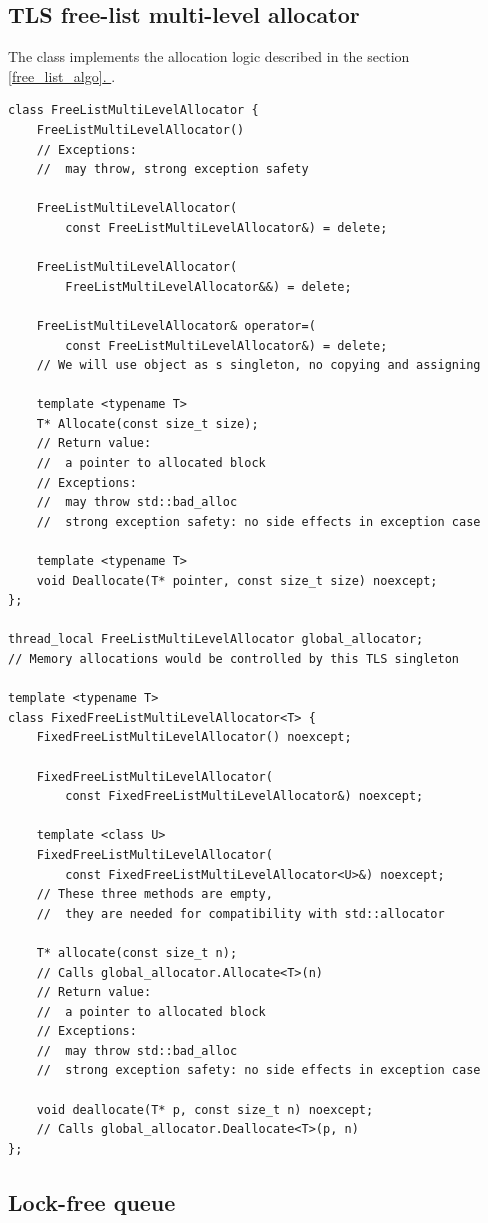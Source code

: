 \documentclass{article}
\newcommand*{\fullref}[1]{\hyperref[{#1}]{\ref*{#1}. \nameref*{#1}}}
\begin{document}
\subsection{TLS free-list multi-level allocator}

The class implements the allocation logic described in the section \fullref{free_list_algo}.

\begin{lstlisting}
class FreeListMultiLevelAllocator {
	FreeListMultiLevelAllocator()
	// Exceptions:
	// 	may throw, strong exception safety

	FreeListMultiLevelAllocator(
		const FreeListMultiLevelAllocator&) = delete;

	FreeListMultiLevelAllocator(
		FreeListMultiLevelAllocator&&) = delete;

	FreeListMultiLevelAllocator& operator=(
		const FreeListMultiLevelAllocator&) = delete;
	// We will use object as s singleton, no copying and assigning

	template <typename T>
	T* Allocate(const size_t size);
	// Return value:
	// 	a pointer to allocated block
	// Exceptions:
	// 	may throw std::bad_alloc
	// 	strong exception safety: no side effects in exception case

	template <typename T>
	void Deallocate(T* pointer, const size_t size) noexcept;
};

thread_local FreeListMultiLevelAllocator global_allocator;
// Memory allocations would be controlled by this TLS singleton

template <typename T>
class FixedFreeListMultiLevelAllocator<T> {
	FixedFreeListMultiLevelAllocator() noexcept;

	FixedFreeListMultiLevelAllocator(
		const FixedFreeListMultiLevelAllocator&) noexcept;

	template <class U>
	FixedFreeListMultiLevelAllocator(
		const FixedFreeListMultiLevelAllocator<U>&) noexcept;
	// These three methods are empty,
	// 	they are needed for compatibility with std::allocator

	T* allocate(const size_t n);
	// Calls global_allocator.Allocate<T>(n)
	// Return value:
	// 	a pointer to allocated block
	// Exceptions:
	// 	may throw std::bad_alloc
	// 	strong exception safety: no side effects in exception case

	void deallocate(T* p, const size_t n) noexcept;
	// Calls global_allocator.Deallocate<T>(p, n)
};
\end{lstlisting}

\subsection{Lock-free queue}
\end{document}

